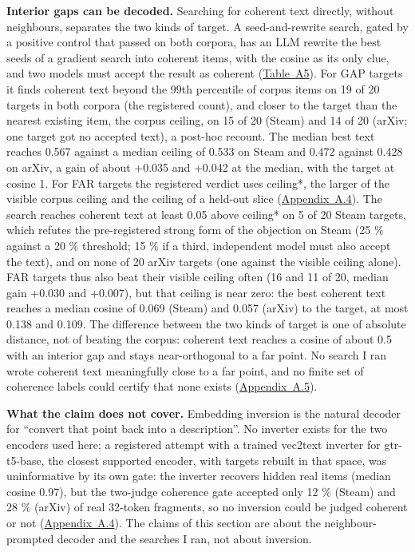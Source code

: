 \documentclass[
  10pt,
]{article}
\begin{document}
\textbf{Interior gaps can be decoded.}
Searching for coherent text directly,
without neighbours, separates the two
kinds of target. A seed-and-rewrite
search, gated by a positive control that
passed on both corpora, has an LLM
rewrite the best seeds of a gradient
search into coherent items, with the
cosine as its only clue, and two models
must accept the result as coherent
(\hyperref[tab:A5]{Table~A5}). For GAP
targets it finds coherent text beyond
the 99th percentile of corpus items on
19 of 20 targets in both corpora (the
registered count), and closer to the
target than the nearest existing item,
the corpus ceiling, on 15 of 20 (Steam)
and 14 of 20 (arXiv; one target got no
accepted text), a post-hoc recount. The
median best text reaches 0.567 against a
median ceiling of 0.533 on Steam and
0.472 against 0.428 on arXiv, a gain of
about +0.035 and +0.042 at the median,
with the target at cosine 1. For FAR
targets the registered verdict uses
ceiling*, the larger of the visible
corpus ceiling and the ceiling of a
held-out slice
(\hyperref[app:A.4]{Appendix~A.4}). The
search reaches coherent text at least
0.05 above ceiling* on 5 of 20 Steam
targets, which refutes the
pre-registered strong form of the
objection on Steam (25 \% against a 20
\% threshold; 15 \% if a third,
independent model must also accept the
text), and on none of 20 arXiv targets
(one against the visible ceiling alone).
FAR targets thus also beat their visible
ceiling often (16 and 11 of 20, median
gain +0.030 and +0.007), but that
ceiling is near zero: the best coherent
text reaches a median cosine of 0.069
(Steam) and 0.057 (arXiv) to the target,
at most 0.138 and 0.109. The difference
between the two kinds of target is one
of absolute distance, not of beating the
corpus: coherent text reaches a cosine
of about 0.5 with an interior gap and
stays near-orthogonal to a far point. No
search I ran wrote coherent text
meaningfully close to a far point, and
no finite set of coherence labels could
certify that none exists
(\hyperref[app:A.5]{Appendix~A.5}).

\textbf{What the claim does not cover.}
Embedding inversion is the natural
decoder for ``convert that point back
into a description''. No inverter exists
for the two encoders used here; a
registered attempt with a trained
vec2text inverter for gtr-t5-base, the
closest supported encoder, with targets
rebuilt in that space, was uninformative
by its own gate: the inverter recovers
hidden real items (median cosine 0.97),
but the two-judge coherence gate
accepted only 12 \% (Steam) and 28 \%
(arXiv) of real 32-token fragments, so
no inversion could be judged coherent or
not (\hyperref[app:A.4]{Appendix~A.4}).
The claims of this section are about the
neighbour-prompted decoder and the
searches I ran, not about inversion.
\end{document}
